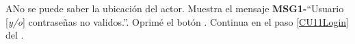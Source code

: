 	\begin{UCtrayectoriaA}{A}{No se puede saber la ubicación del actor.}
		\UCpaso Muestra el mensaje {\bf MSG1-}``Usuario [{\em y/o}] contraseñas no validos.''.
		\UCpaso[\UCactor] Oprimé el botón .
		\UCpaso Continua en el paso \ref{CU11Login} del .
	\end{UCtrayectoriaA}
		
%
%		
